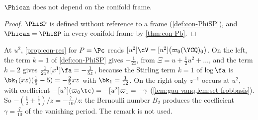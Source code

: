 \begin{cor}
\label{cor:con-frame}
$\Phican$ does not depend on the conifold frame.
\end{cor}

\begin{proof}
$\PhiSP$ is defined without reference to a frame (\cref{def:con-PhiSP}), and $\Phican=\PhiSP$ in every conifold frame by \cref{thm:con-Pb}.
\end{proof}

\begin{rmk}
\label{rmk:con-710}
At $u^2$, \cref{prop:con-res} for $P=\Pc$ reads $[u^2]\cV=[u^2]\bigl(\varpi_0(\YCQ)_0\bigr)$. On the left, the term $k=1$ of \cref{def:con-PhiSP} gives $-\frac1{2z}$, from $\Xi=u+\frac12u^2+\dots$, and the term $k=2$ gives $\frac1{2z^2}[x^1]\fa=-\frac1{5z}$, because the Stirling term $k=1$ of $\log\fa$ is $\bk_1(xz)(\frac15-5)=-\frac25xz$ with $\bk_1=\frac1{12}$. On the right only $z^{-1}$ occurs at $u^2$, with coefficient $-[u^2](\varpi_0\tc)=-[u^2]\varpi_1=-\gamma$ (\cref{lem:gau-vanq,lem:set-frobbasis}). So $-(\frac12+\frac15)/z=-\frac7{10}/z$: the Bernoulli number $B_2$ produces the coefficient $\gamma=\frac7{10}$ of the vanishing period. The remark is not used.
\end{rmk}


